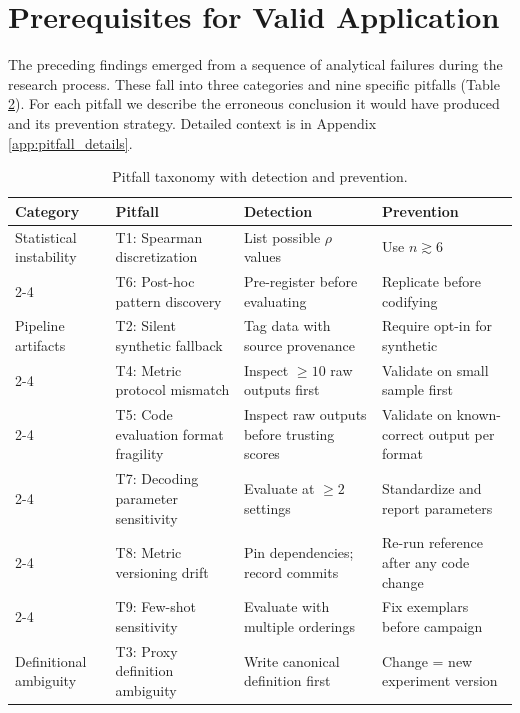 \documentclass[pdflatex,sn-mathphys-ay,iicol]{sn-jnl}
\theoremstyle{thmstylethree}
\begin{document}
\begin{table}[t]
\section{Prerequisites for Valid Application}\label{sec:pitfalls}

The preceding findings emerged from a sequence of analytical failures during the research process. These fall into three categories and nine specific pitfalls (Table~
\ref{tab:pitfalls_summary}). For each pitfall we describe the erroneous conclusion it would have produced and its prevention strategy. Detailed context is in Appendix~
\ref{app:pitfall_details}.

\begin{table}[t]
\centering
\caption{Pitfall taxonomy with detection and prevention.}
\label{tab:pitfalls_summary}
\footnotesize
\setlength{\tabcolsep}{4pt}
\begin{tabular}{p{2.5cm}p{3cm}p{3.2cm}p{3.5cm}}\toprule
\textbf{Category} & \textbf{Pitfall} & \textbf{Detection} & \textbf{Prevention} \\\midrule
Statistical instability & T1: Spearman discretization & List possible $\rho$ values & Use $n\gtrsim6$ \\
\cmidrule{2-4}
 & T6: Post-hoc pattern discovery & Pre-register before evaluating & Replicate before codifying \\
\midrule
Pipeline artifacts & T2: Silent synthetic fallback & Tag data with source provenance & Require opt-in for synthetic \\
\cmidrule{2-4}
 & T4: Metric protocol mismatch & Inspect $\ge10$ raw outputs first & Validate on small sample first \\
\cmidrule{2-4}
 & T5: Code evaluation format fragility & Inspect raw outputs before trusting scores & Validate on known-correct output per format \\
\cmidrule{2-4}
 & T7: Decoding parameter sensitivity & Evaluate at $\ge2$ settings & Standardize and report parameters \\
\cmidrule{2-4}
 & T8: Metric versioning drift & Pin dependencies; record commits & Re-run reference after any code change \\
\cmidrule{2-4}
 & T9: Few-shot sensitivity & Evaluate with multiple orderings & Fix exemplars before campaign \\
\midrule
Definitional ambiguity & T3: Proxy definition ambiguity & Write canonical definition first & Change = new experiment version \\
\bottomrule
\end{tabular}
\end{table}


\end{table}
\end{document}
